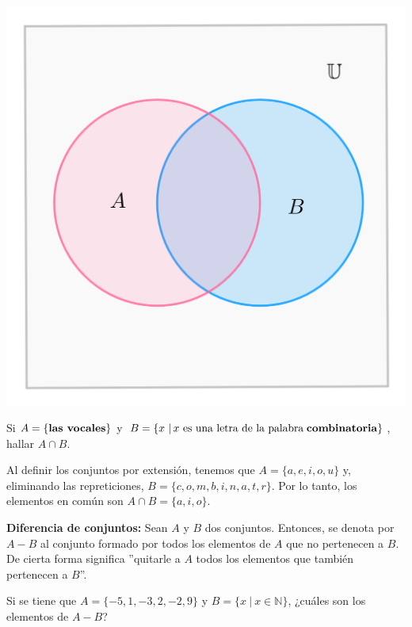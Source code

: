 \begin{center}
    \includegraphics[scale=0.7]{Imagenes/IMG1/S1-1-03.png}
\end{center}

\begin{ejemplo}
    Si $A=\{\text{\textbf{las vocales}}\}$ y $B=\{x \ | \,\text{$x$ es una letra de la palabra}\;\text{\textbf{combinatoria}}\}$, hallar $A \cap B$.
\end{ejemplo}

\begin{solucion}
    Al definir los conjuntos por extensión, tenemos que $A=\{a,e,i,o,u\}$ y, eliminando las repreticiones, $B=\{c,o,m,b,i,n,a,t,r\}$.  Por lo tanto, los elementos en común son $A \cap B=\{a,i,o\}$.
\end{solucion}

\textbf{Diferencia de conjuntos:} Sean $A$ y $B$ dos conjuntos. Entonces, se denota por $A-B$ al conjunto formado por todos los elementos de $A$ que no pertenecen a $B$. De cierta forma significa ''quitarle a $A$ todos los elementos que también pertenecen a $B$''.

\begin{ejemplo}
    Si se tiene que $A=\{-5,1,-3,2,-2,9\}$ y $B=\{x \ | \ x \in \mathbb{N} \}$, ¿cuáles son los elementos de $A-B$?
\end{ejemplo}

